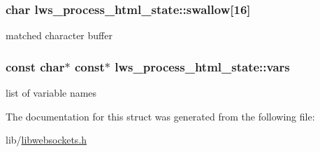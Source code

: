 \subsubsection[{\texorpdfstring{swallow}{swallow}}]{\setlength{\rightskip}{0pt plus 5cm}char lws\+\_\+process\+\_\+html\+\_\+state\+::swallow\mbox{[}16\mbox{]}}\hypertarget{structlws__process__html__state_a71982bc1cbd8cf876ca0f545144404eb}{}\label{structlws__process__html__state_a71982bc1cbd8cf876ca0f545144404eb}
matched character buffer 
\subsubsection[{\texorpdfstring{vars}{vars}}]{\setlength{\rightskip}{0pt plus 5cm}const char$\ast$ const$\ast$ lws\+\_\+process\+\_\+html\+\_\+state\+::vars}\hypertarget{structlws__process__html__state_a3b113e00c03a2fded51b1c85ff5bf077}{}\label{structlws__process__html__state_a3b113e00c03a2fded51b1c85ff5bf077}
list of variable names 

The documentation for this struct was generated from the following file\+:\begin{DoxyCompactItemize}
\item 
lib/\hyperlink{libwebsockets_8h}{libwebsockets.\+h}\end{DoxyCompactItemize}
